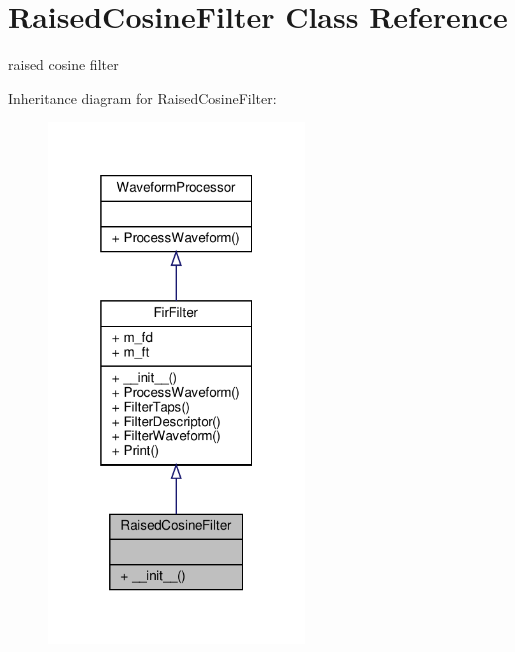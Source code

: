 \hypertarget{classSignalIntegrity_1_1TimeDomain_1_1Filters_1_1RaisedCosineFilter_1_1RaisedCosineFilter}{}\section{Raised\+Cosine\+Filter Class Reference}
\label{classSignalIntegrity_1_1TimeDomain_1_1Filters_1_1RaisedCosineFilter_1_1RaisedCosineFilter}


raised cosine filter  




Inheritance diagram for Raised\+Cosine\+Filter\+:\nopagebreak
\begin{figure}[H]
\begin{center}
\leavevmode
\includegraphics[width=193pt]{classSignalIntegrity_1_1TimeDomain_1_1Filters_1_1RaisedCosineFilter_1_1RaisedCosineFilter__inherit__graph}
\end{center}
\end{figure}


